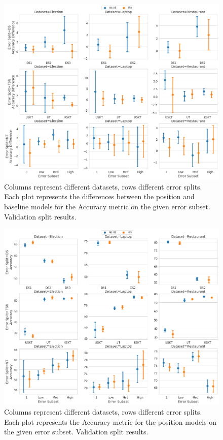 \begin{figure}[h!]
    \centering
    \includegraphics[scale=0.32]{images/augmentation/methods_performance/Position_Encoding/position_split_difference_validation_results.png}
    \caption{Columns represent different datasets, rows different error splits. Each plot represents the differences between the position and baseline models for the Accuracy metric on the given error subset. Validation split results.}
    \label{fig:aug_position_split_difference_validation_results}
\end{figure}

\begin{figure}[h!]
    \centering
    \includegraphics[scale=0.32]{images/augmentation/methods_performance/Position_Encoding/position_split_overall_validation_results.png}
    \caption{Columns represent different datasets, rows different error splits. Each plot represents the Accuracy metric for the position models on the given error subset. Validation split results.}
    \label{fig:aug_position_split_overall_validation_results}
\end{figure}

